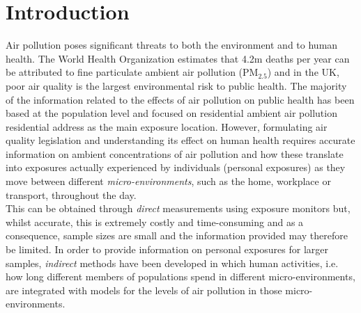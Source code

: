\documentclass{article}
\begin{document}
\tableofcontents
\newpage
\listoffigures
\newpage
\listoftables
\newpage

\clearpage
\section{Introduction}\label{sec::execsummary}


Air pollution poses significant threats to both the environment and to human health. The World Health Organization estimates that 4.2m deaths per year can be attributed to fine particulate ambient air pollution (PM$_{2.5}$) and in the UK, poor air quality is the largest environmental risk to public health. The majority of the information related to the effects of air pollution on public health has been based at the population level and focused on residential ambient air pollution residential address as the main exposure location. However, formulating air quality legislation and understanding its effect on human health requires accurate information on ambient concentrations of air pollution and how these translate into exposures actually experienced by individuals (personal exposures) as they move between different \emph{micro-environments},  such as the home, workplace or transport, throughout the day. \\

\noindent This can be obtained through \emph{direct} measurements  using exposure monitors but, whilst accurate, this is extremely costly and time-consuming and as a consequence,  sample sizes are small and the information provided may therefore be limited. In order to provide information on personal exposures for larger samples, \emph{indirect} methods have been developed in which  human activities, i.e. how long different members of populations spend in different micro-environments,  are integrated with models  for the levels of air pollution in those micro-environments. \\
\end{document}
